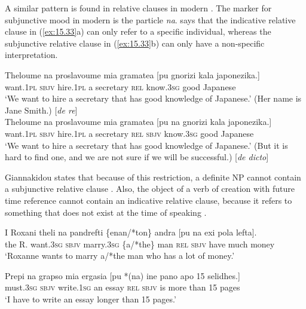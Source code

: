 A similar pattern is found in relative clauses in modern . The marker for subjunctive mood in modern  is the particle \textit{na}. \citet{Giannakidou2011} says that the indicative relative clause in (\ref{ex:15.33}a) can only refer to a specific individual, whereas the subjunctive relative clause in (\ref{ex:15.33}b) can only have a non-specific interpretation.


\ea \label{ex:15.33}
\ea  \gll Theloume  na  proslavoume  mia  gramatea  [pu  gnorizi  kala  japonezika.]\\
want.\textsc{1pl} \textsc{sbjv}  hire.\textsc{1pl} a  secretary  \textsc{rel}  know.\textsc{3sg} good  {Japanese}\\
\glt ‘We want to hire a secretary that has good knowledge of {Japanese}.’ (Her name is Jane Smith.) \hfill  [\textit{de re}] \\
\medskip
\ex \gll  Theloume  na  proslavoume  mia  gramatea [pu  na  gnorizi  kala  japonezika.]\\
want.\textsc{1pl} \textsc{sbjv}  hire.\textsc{1pl} a  secretary \textsc{rel}  \textsc{sbjv}  know.\textsc{3sg} good  {Japanese}\\
\glt ‘We want to hire a secretary that has good knowledge of {Japanese}.’ (But it is hard to find one, and we are not sure if we will be successful.) \hfill  [\textit{de dicto}]\\
\z \z


Giannakidou states that because of this restriction, a definite NP cannot contain a subjunctive relative clause . Also, the object of a verb of creation with future time reference cannot contain an indicative relative clause, because it refers to something that does not exist at the time of speaking .


\ea \label{ex:15.34} 
\gll I  Roxani  theli  na  pandrefti  \{enan/*ton\}  andra [pu  na  exi  pola  lefta]. \\
the  R.  want.\textsc{3sg} \textsc{sbjv}  marry.\textsc{3sg} \{a/*the\}  man  \textsc{rel}  \textsc{sbjv}  have  much  money\\
\glt ‘Roxanne wants to marry a/*the man who has a lot of money.’\\
\z 

\ea \label{ex:15.35}
\gll Prepi  na  grapso  mia  ergasia  [pu  *(na)\footnotemark {} ine  pano  apo  15  selidhes.]\\
must.\textsc{3sg} \textsc{sbjv}  write.\textsc{1sg} an  essay  \textsc{rel}  \textsc{sbjv}  is  more  than  15  pages\\
\glt ‘I have to write an essay longer than 15 pages.’\\
\z
{}

